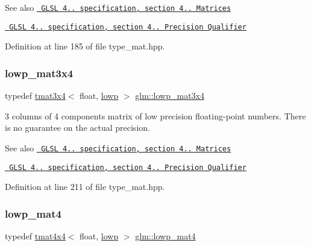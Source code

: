 \begin{DoxySeeAlso}{See also}
\href{http://www.opengl.org/registry/doc/GLSLangSpec.4.20.8.pdf}{\texttt{ G\+L\+SL 4.. specification, section 4.. Matrices}} 

\href{http://www.opengl.org/registry/doc/GLSLangSpec.4.20.8.pdf}{\texttt{ G\+L\+SL 4.. specification, section 4.. Precision Qualifier}} 
\end{DoxySeeAlso}


Definition at line 185 of file type\+\_\+mat.\+hpp.

\mbox{\label{group__core__precision_ga06b2903b2f784e0e74e58f25e9b79b15}} 
\subsubsection{\texorpdfstring{lowp\_mat3x4}{lowp\_mat3x4}}
{\footnotesize\ttfamily typedef \mbox{\hyperlink{structglm_1_1tmat3x4}{tmat3x4}}$<$ float, \mbox{\hyperlink{namespaceglm_a0f04f086094c747d227af4425893f545ae161af3fc695e696ce3bf69f7332bc2d}{lowp}} $>$ \mbox{\hyperlink{group__core__precision_ga06b2903b2f784e0e74e58f25e9b79b15}{glm\+::lowp\+\_\+mat3x4}}}

3 columns of 4 components matrix of low precision floating-\/point numbers. There is no guarantee on the actual precision.

\begin{DoxySeeAlso}{See also}
\href{http://www.opengl.org/registry/doc/GLSLangSpec.4.20.8.pdf}{\texttt{ G\+L\+SL 4.. specification, section 4.. Matrices}} 

\href{http://www.opengl.org/registry/doc/GLSLangSpec.4.20.8.pdf}{\texttt{ G\+L\+SL 4.. specification, section 4.. Precision Qualifier}} 
\end{DoxySeeAlso}


Definition at line 211 of file type\+\_\+mat.\+hpp.

\mbox{\label{group__core__precision_ga070380d2efa0c37d16f8677412518e02}} 
\subsubsection{\texorpdfstring{lowp\_mat4}{lowp\_mat4}}
{\footnotesize\ttfamily typedef \mbox{\hyperlink{structglm_1_1tmat4x4}{tmat4x4}}$<$ float, \mbox{\hyperlink{namespaceglm_a0f04f086094c747d227af4425893f545ae161af3fc695e696ce3bf69f7332bc2d}{lowp}} $>$ \mbox{\hyperlink{group__core__precision_ga070380d2efa0c37d16f8677412518e02}{glm\+::lowp\+\_\+mat4}}}

